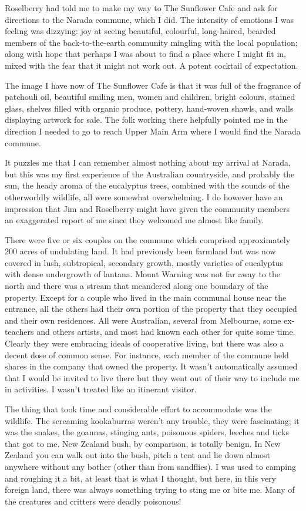 Roselberry had told me to make my way to The Sunflower Cafe and ask for
directions to the Narada commune, which I did. The intensity of emotions
I was feeling was dizzying: joy at seeing beautiful, colourful,
long-haired, bearded members of the back-to-the-earth community mingling
with the local population; along with hope that perhaps I was about to
find a place where I might fit in, mixed with the fear that it might not
work out. A potent cocktail of expectation.

The image I have now of The Sunflower Cafe is that it was full of the
fragrance of patchouli oil, beautiful smiling men, women and children,
bright colours, stained glass, shelves filled with organic produce,
pottery, hand-woven shawls, and walls displaying artwork for sale. The
folk working there helpfully pointed me in the direction I needed to go
to reach Upper Main Arm where I would find the Narada commune.

It puzzles me that I can remember almost nothing about my arrival at
Narada, but this was my first experience of the Australian countryside,
and probably the sun, the heady aroma of the eucalyptus trees, combined
with the sounds of the otherworldly wildlife, all were somewhat
overwhelming. I do however have an impression that Jim and Roselberry
might have given the community members an exaggerated report of me since
they welcomed me almost like family.

There were five or six couples on the commune which comprised
approximately 200 acres of undulating land. It had previously been
farmland but was now covered in lush, subtropical, secondary growth,
mostly varieties of eucalyptus with dense undergrowth of lantana. Mount
Warning was not far away to the north and there was a stream that
meandered along one boundary of the property. Except for a couple who
lived in the main communal house near the entrance, all the others had
their own portion of the property that they occupied and their own
residences. All were Australian, several from Melbourne, some
ex-teachers and others artists, and most had known each other for quite
some time. Clearly they were embracing ideals of cooperative living, but
there was also a decent dose of common sense. For instance, each member
of the commune held shares in the company that owned the property. It
wasn't automatically assumed that I would be invited to live there but
they went out of their way to include me in activities. I wasn't treated
like an itinerant visitor.

The thing that took time and considerable effort to accommodate was the
wildlife. The screaming kookaburras weren't any trouble, they were
fascinating; it was the snakes, the goannas, stinging ants, poisonous
spiders, leeches and ticks that got to me. New Zealand bush, by
comparison, is totally benign. In New Zealand you can walk out into the
bush, pitch a tent and lie down almost anywhere without any bother
(other than from sandflies). I was used to camping and roughing it a
bit, at least that is what I thought, but here, in this very foreign
land, there was always something trying to sting me or bite me. Many of
the creatures and critters were deadly poisonous!

